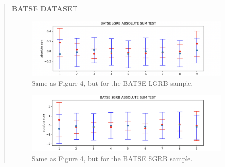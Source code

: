 \documentclass[12pt]{article}
\begin{document}
\newpage
\begin{quote}
    \textbf{BATSE DATASET}\\
    \begin{center}
    \begin{figure}
        \centering
        \includegraphics{BATSE LGRB sum test.png}
        \caption{Same as Figure 4, but for the BATSE LGRB sample.}
        \label{fig:enter-label}
    \end{figure}
    \begin{figure}
        \centering
        \includegraphics{BATSE SGRB sum test.png}
        \caption{Same as Figure 4, but for the BATSE SGRB sample.}
        \label{fig:enter-label}
    \end{figure}
    \end{center}
\end{quote}
\newpage
\end{document}
